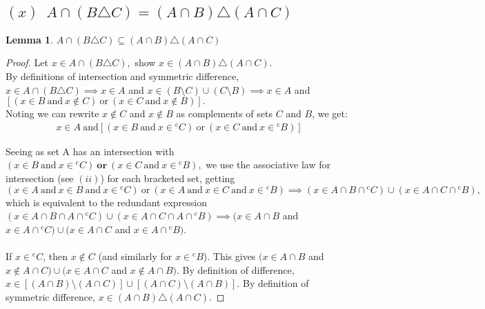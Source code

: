 \documentclass[12pt]{article}
\newtheorem{lemma}[theorem]{Lemma}
\theoremstyle{definition}
\numberwithin{equation}{subsection}
\begin{document}
\subsection*{$(x) \enspace A \cap (B \triangle C) = (A \cap B) \triangle (A \cap C)$}
\begin{lemma}
$A \cap (B \triangle C) \subseteq (A \cap B) \triangle (A \cap C)$
\end{lemma}
\begin{proof}
Let $x \in A \cap (B \triangle C),$ show $x \in (A \cap B) \triangle (A \cap C).$\\
By definitions of intersection and symmetric difference, $x \in A \cap (B \triangle C) \implies x \in A$ and $x \in (B \setminus C) \cup (C \setminus B) \implies x \in A$ and $\left [( x \in B \ \text{and} \ x \notin C ) \ \text{or}\ ( x \in C \ \text{and} \ x \notin B) \right].$ \\
Noting we can rewrite $x \notin C$ and $x \notin B$ as complements of sets $C$ and $B$, we get:
\begin{align*}
    x \in A \ \text{and} \left [( x \in B \ \text{and} \ x \in {^{\mathrm{c}}}{C} ) \ \text{or}\ ( x \in C \ \text{and} \ x \in {^{\mathrm{c}}}{B}) \right]
\end{align*}

Seeing as set A has an intersection with $ ( x \in B \ \text{and} \ x \in {^{\mathrm{c}}}{C} ) \ \textbf{or}\ ( x \in C \ \text{and} \ x \in {^{\mathrm{c}}}{B}),$ we use the associative law for intersection (see $(ii)$) for each bracketed set, getting $ (x\in A \ \text{and} \ x \in B \ \text{and} \ x \in {^{\mathrm{c}}}{C} ) \ \text{or}\ (x \in A \ \text{and} \ x \in C \ \text{and} \ x \in {^{\mathrm{c}}}{B}) \implies (x \in A\cap B \cap {^{\mathrm{c}}}{C})\cup (x \in A\cap C \cap {^{\mathrm{c}}}{B}),$ which is equivalent to the redundant expression $(x \in A\cap B \cap A \cap {^{\mathrm{c}}}{C})\cup (x \in A\cap C \cap A \cap {^{\mathrm{c}}}{B}) \implies (x \in A \cap B$ and $x \in A \cap {^{\mathrm{c}}}{C})\cup(x \in A \cap C$ and $x \in A \cap {^{\mathrm{c}}}{B}).$ \\ \\
If $x \in {^{\mathrm{c}}}{C}$, then $x \notin C$ (and similarly for $x \in {^{\mathrm{c}}}{B}$). This gives $(x \in A \cap B$ and $x \notin A \cap C)\cup(x \in A \cap C$ and $x \notin A \cap B).$ By definition of difference, $x \in [(A \cap B)\setminus (A \cap C)] \cup  [(A \cap C)\setminus (A \cap B)].$ By definition of symmetric difference, $x \in (A \cap B) \triangle (A \cap C).$
\end{proof}
\end{document}
